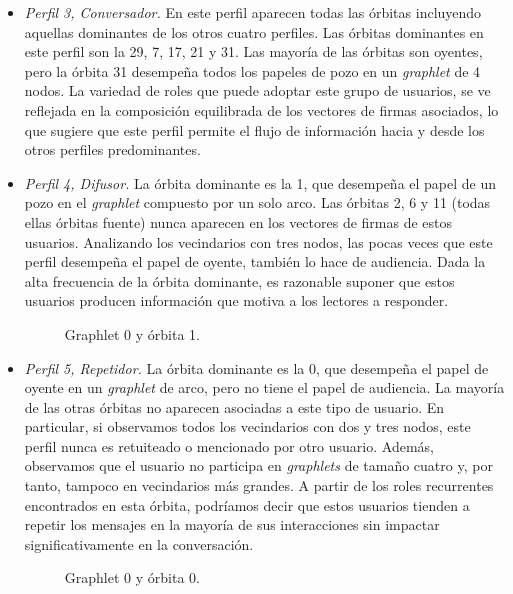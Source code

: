 \begin{itemize}
\item \emph{Perfil 3, Conversador.} En este perfil aparecen todas las órbitas incluyendo aquellas dominantes de los otros cuatro perfiles. Las órbitas dominantes en este perfil son la 29, 7, 17, 21 y 31. Las mayoría de las órbitas son oyentes, pero la órbita 31 desempeña todos los papeles de pozo en un \textit{graphlet} de 4 nodos. La variedad de roles que puede adoptar este grupo de usuarios, se ve reflejada en la composición equilibrada de los vectores de firmas asociados, lo que sugiere que este perfil permite el flujo de información hacia y desde los otros perfiles predominantes.

\item \emph{Perfil 4, Difusor.} La órbita dominante es la 1, que desempeña el papel de un pozo en el \textit{graphlet} compuesto por un solo arco. Las órbitas 2, 6 y 11 (todas ellas órbitas fuente) nunca aparecen en los vectores de firmas de estos usuarios. Analizando los vecindarios con tres nodos, las pocas veces que este perfil desempeña el papel de oyente, también lo hace de audiencia. Dada la alta frecuencia de la órbita dominante, es razonable suponer que estos usuarios producen información que motiva a los lectores a responder. 
\begin{figure}[htbp]
   \centering
   
    \caption{Graphlet 0 y órbita 1.}
    \label{img:web-comp}
\end{figure}

\item \emph{Perfil 5, Repetidor.} La órbita dominante es la 0, que desempeña el papel de oyente en un \textit{graphlet} de arco, pero no tiene el papel de audiencia. La mayoría de las otras órbitas no aparecen asociadas a este tipo de usuario. En particular, si observamos todos los vecindarios con dos y tres nodos, este perfil nunca es retuiteado o mencionado por otro usuario. Además, observamos que el usuario no participa en \textit{graphlets} de tamaño cuatro y, por tanto, tampoco en vecindarios más grandes. A partir de los roles recurrentes encontrados en esta órbita, podríamos decir que estos usuarios tienden a repetir los mensajes en la mayoría de sus interacciones sin impactar significativamente en la conversación. \begin{figure}[htbp]
   \centering
   
    \caption{Graphlet 0 y órbita 0.}
    \label{img:web-comp}
\end{figure}


\end{itemize}


